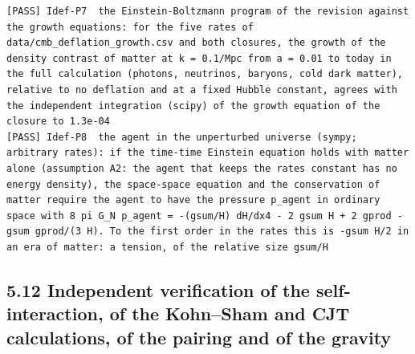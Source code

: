 \documentclass[
  10pt,
]{article}
\begin{document}
\begin{verbatim}
[PASS] Idef-P7  the Einstein-Boltzmann program of the revision against the growth equations: for the five rates of data/cmb_deflation_growth.csv and both closures, the growth of the density contrast of matter at k = 0.1/Mpc from a = 0.01 to today in the full calculation (photons, neutrinos, baryons, cold dark matter), relative to no deflation and at a fixed Hubble constant, agrees with the independent integration (scipy) of the growth equation of the closure to 1.3e-04
[PASS] Idef-P8  the agent in the unperturbed universe (sympy; arbitrary rates): if the time-time Einstein equation holds with matter alone (assumption A2: the agent that keeps the rates constant has no energy density), the space-space equation and the conservation of matter require the agent to have the pressure p_agent in ordinary space with 8 pi G_N p_agent = -(gsum/H) dH/dx4 - 2 gsum H + 2 gprod - gsum gprod/(3 H). To the first order in the rates this is -gsum H/2 in an era of matter: a tension, of the relative size gsum/H
\end{verbatim}

\hypertarget{independent-verification-of-the-self-interaction-of-the-kohnsham-and-cjt-calculations-of-the-pairing-and-of-the-gravity}{%
\subsection{5.12 Independent verification of the self-interaction, of
the Kohn--Sham and CJT calculations, of the pairing and of the
gravity}\label{independent-verification-of-the-self-interaction-of-the-kohnsham-and-cjt-calculations-of-the-pairing-and-of-the-gravity}}
\end{document}
